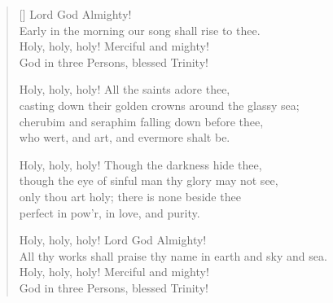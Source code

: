 \newHymn
{}

\begin{verse}[\versewidth]
 Lord God Almighty!\\
Early in the morning our song shall rise to thee.\\
Holy, holy, holy! Merciful and mighty!\\
God in three Persons, blessed Trinity!

Holy, holy, holy! All the saints adore thee,\\
casting down their golden crowns around the glassy sea;\\
cherubim and seraphim falling down before thee,\\
who wert, and art, and evermore shalt be.

Holy, holy, holy! Though the darkness hide thee,\\
though the eye of sinful man thy glory may not see,\\
only thou art holy; there is none beside thee\\
perfect in pow'r, in love, and purity.

Holy, holy, holy! Lord God Almighty!\\
All thy works shall praise thy name in earth and sky and sea.\\
Holy, holy, holy! Merciful and mighty!\\
God in three Persons, blessed Trinity!

\end{verse}


